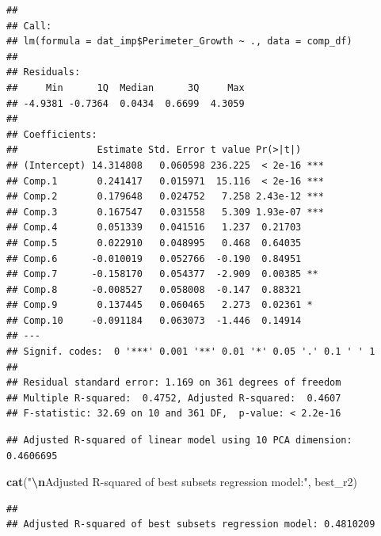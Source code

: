 \documentclass[
]{article}
\newenvironment{Shaded}{\begin{snugshade}}{\end{snugshade}}
\newcommand{\FunctionTok}[1]{\textcolor[rgb]{0.13,0.29,0.53}{\textbf{#1}}}
\newcommand{\NormalTok}[1]{#1}
\newcommand{\SpecialCharTok}[1]{\textcolor[rgb]{0.81,0.36,0.00}{\textbf{#1}}}
\newcommand{\StringTok}[1]{\textcolor[rgb]{0.31,0.60,0.02}{#1}}
\begin{document}
\begin{verbatim}
## 
## Call:
## lm(formula = dat_imp$Perimeter_Growth ~ ., data = comp_df)
## 
## Residuals:
##     Min      1Q  Median      3Q     Max 
## -4.9381 -0.7364  0.0434  0.6699  4.3059 
## 
## Coefficients:
##              Estimate Std. Error t value Pr(>|t|)    
## (Intercept) 14.314808   0.060598 236.225  < 2e-16 ***
## Comp.1       0.241417   0.015971  15.116  < 2e-16 ***
## Comp.2       0.179648   0.024752   7.258 2.43e-12 ***
## Comp.3       0.167547   0.031558   5.309 1.93e-07 ***
## Comp.4       0.051339   0.041516   1.237  0.21703    
## Comp.5       0.022910   0.048995   0.468  0.64035    
## Comp.6      -0.010019   0.052766  -0.190  0.84951    
## Comp.7      -0.158170   0.054377  -2.909  0.00385 ** 
## Comp.8      -0.008527   0.058008  -0.147  0.88321    
## Comp.9       0.137445   0.060465   2.273  0.02361 *  
## Comp.10     -0.091184   0.063073  -1.446  0.14914    
## ---
## Signif. codes:  0 '***' 0.001 '**' 0.01 '*' 0.05 '.' 0.1 ' ' 1
## 
## Residual standard error: 1.169 on 361 degrees of freedom
## Multiple R-squared:  0.4752, Adjusted R-squared:  0.4607 
## F-statistic: 32.69 on 10 and 361 DF,  p-value: < 2.2e-16
\end{verbatim}

\begin{Shaded}
\end{Shaded}

\begin{verbatim}
## Adjusted R-squared of linear model using 10 PCA dimension: 0.4606695
\end{verbatim}

\begin{Shaded}
\begin{Highlighting}[]
\FunctionTok{cat}\NormalTok{(}\StringTok{"}\SpecialCharTok{\textbackslash{}n}\StringTok{Adjusted R{-}squared of best subsets regression model:"}\NormalTok{, best\_r2)}
\end{Highlighting}
\end{Shaded}

\begin{verbatim}
## 
## Adjusted R-squared of best subsets regression model: 0.4810209
\end{verbatim}
\end{document}
